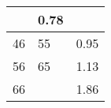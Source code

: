 \begin{tabular}{|p{0.23\tablewidth}|p{0.24\tablewidth}|p{0.53\tablewidth}|}
	 & \color[HTML]{000000}\cellcolor[HTML]{FFCC99}0.78                                                                                                                                                            \\ \hline
	\color[HTML]{000000}\cellcolor[HTML]{FFFF99}46
	 & \color[HTML]{000000}\cellcolor[HTML]{FFFF99}55
	 & \color[HTML]{000000}\cellcolor[HTML]{FFCC99}0.95                                                                                                                                                            \\ \hline
	\color[HTML]{000000}\cellcolor[HTML]{FFFF99}56
	 & \color[HTML]{000000}\cellcolor[HTML]{FFFF99}65
	 & \color[HTML]{000000}\cellcolor[HTML]{FFCC99}1.13                                                                                                                                                            \\ \hline
	\color[HTML]{000000}\cellcolor[HTML]{FFFF99}66
	 & \cellcolor[HTML]{FFFF99}
	 & \color[HTML]{000000}\cellcolor[HTML]{FFCC99}1.86                                                                                                                                                            \\ \hline
\end{tabular}

